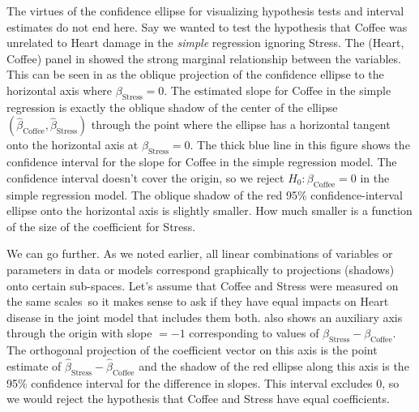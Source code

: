 The virtues of the confidence ellipse for visualizing hypothesis tests and interval estimates
do not end here. Say we wanted to test the hypothesis that Coffee was unrelated to Heart damage
in the \emph{simple} regression ignoring Stress.  The (Heart, Coffee) panel in 
showed the strong marginal relationship between the variables.  This can be seen in  as
the oblique projection of the confidence ellipse to the horizontal axis where $\beta_{\mathrm{Stress}}=0$.
The estimated slope for Coffee in the simple regression is exactly the oblique shadow of
the center of the ellipse $(\widehat{\beta}_{\mathrm{Coffee}}, \widehat{\beta}_{\mathrm{Stress}})$
through the point where the ellipse has a horizontal tangent onto the horizontal axis at
$\beta_{\mathrm{Stress}}=0$. The thick blue line in this figure shows the confidence interval
for the slope for Coffee in the simple regression model. The confidence interval doesn't cover the origin, so
we reject $H_0: \beta_{\mathrm{Coffee}} = 0$ in the simple regression model.
The oblique shadow of the red 95\% confidence-interval ellipse onto the horizontal axis
is slightly smaller.  How much smaller is a function of the size of the coefficient for Stress.


We can go further.  As we noted earlier, all linear combinations of variables or parameters
in data or models correspond graphically to projections (shadows) onto certain sub-spaces.
Let's assume that Coffee and Stress were measured on the same scales\, so it makes sense
to ask if they have equal impacts on Heart disease in the joint model that includes them both.
 also shows an auxiliary axis through the origin with slope $=-1$
corresponding to values of $\beta_{\mathrm{Stress}} - \beta_{\mathrm{Coffee}}$. The orthogonal
projection of the coefficient vector on this axis is the point estimate of
$\widehat{\beta}_{\mathrm{Stress}} - \widehat{\beta}_{\mathrm{Coffee}}$
and the shadow of the red ellipse along this axis is the 95\% confidence interval
for the difference in slopes. This interval excludes 0, so we would reject the hypothesis
that Coffee and Stress have equal coefficients.

